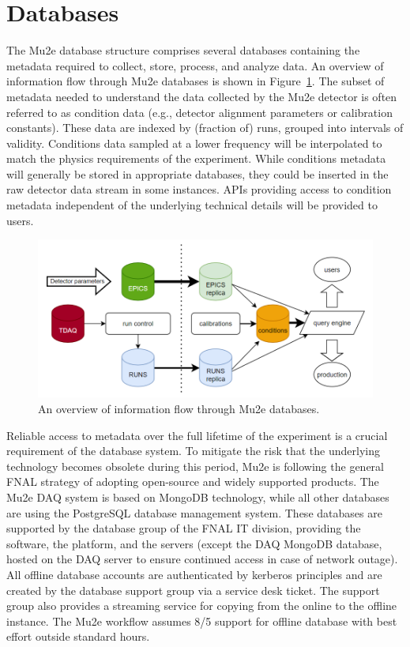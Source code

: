 \section{Databases}
\label{sec:databases}

The Mu2e database structure comprises several databases containing the metadata required to collect, store, process, and analyze data. An overview of information flow through Mu2e databases is shown in Figure~\ref{fig:db}. The subset of metadata needed to understand the data collected by the Mu2e detector is often referred to as condition data (e.g., detector alignment parameters or calibration constants). These data are indexed by (fraction of) runs, grouped into intervals of validity. Conditions data sampled at a lower frequency will be interpolated to match the physics requirements of the experiment. While conditions metadata will generally be stored in appropriate databases, they could be inserted in the raw detector data stream in some instances. APIs providing access to condition metadata independent of the underlying technical details will be provided to users. 

\begin{figure}[htb]
\begin{center}
\includegraphics[width=0.8\linewidth]{figures/db.png}
\caption{An overview of information flow through Mu2e databases.}
\label{fig:db}
\end{center}
\end{figure}

Reliable access to metadata over the full lifetime of the experiment is a crucial requirement of the database system. To mitigate the risk that the underlying technology becomes obsolete during this period, Mu2e is following the general FNAL strategy of adopting open-source and widely supported products. The Mu2e DAQ system is based on MongoDB technology, while all other databases are using the PostgreSQL database management system. These databases are supported by the database group of the FNAL IT division, providing the software, the platform, and the servers (except the DAQ MongoDB database, hosted on the DAQ server to ensure continued access in case of network outage). All offline database accounts are authenticated by kerberos principles and are created by the database support group via a service desk ticket. The support group also provides a streaming service for copying from the online to the offline instance. The Mu2e workflow assumes 8/5 support for offline database with best effort outside standard hours.

